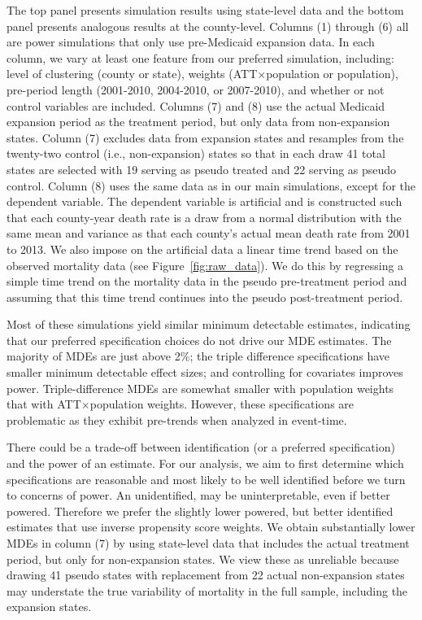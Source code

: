 \documentclass[12pt]{article}%
\begin{document}
The top panel presents simulation results using state-level data and the bottom panel presents analogous results at the county-level. 
Columns (1) through (6) all are power simulations that only use pre-Medicaid expansion data. 
In each column, we vary at least one feature from our  preferred simulation, including:  level of clustering (county or state),  weights  (ATT$\times$population or population), pre-period length (2001-2010, 2004-2010, or 2007-2010), and whether or not control variables are included.
Columns (7) and (8) use the actual Medicaid expansion period as the treatment period, but only data from non-expansion states. 
Column (7) excludes data from expansion states and resamples from the twenty-two control (i.e., non-expansion) states so that in each draw 41 total states are selected with 19 serving as pseudo treated and 22 serving as pseudo control. 
Column (8) uses the same data as in our main simulations, except for the dependent variable.
The dependent variable is artificial and is constructed such that each county-year death rate is a draw from a normal distribution with the same mean and variance as that each county's actual mean death rate from 2001 to 2013.
We also impose on the artificial data a linear time trend based on the observed mortality data (see Figure~\ref{fig:raw_data}).
We do this by regressing a simple time trend on the mortality data in the pseudo pre-treatment period and assuming that this time trend continues into the pseudo post-treatment period.

Most of these simulations yield similar minimum detectable estimates, indicating that our preferred specification choices do not drive our MDE estimates. 
The majority of MDEs are just above 2\%; the triple difference specifications have smaller minimum detectable effect sizes; and controlling for covariates improves power.
Triple-difference MDEs are somewhat smaller with population weights that with ATT$\times$population weights. 
However, these specifications are problematic as they exhibit pre-trends when analyzed in event-time.

  There could be a trade-off between identification (or a preferred specification) and the power of an estimate. 
  For our analysis, we aim to first determine which specifications are reasonable and most likely to be well identified before we turn to concerns of power. 
  An unidentified, may be uninterpretable, even if better powered.  
  Therefore we prefer the slightly lower powered, but better identified estimates that use inverse propensity score weights. 
  We obtain substantially lower MDEs in column (7) by using state-level data that includes the actual treatment period, but only for non-expansion states.  We view these as unreliable because drawing 41 pseudo states with replacement from 22 actual non-expansion states may understate the true variability of mortality in the full sample,  including the expansion states.
\end{document}
